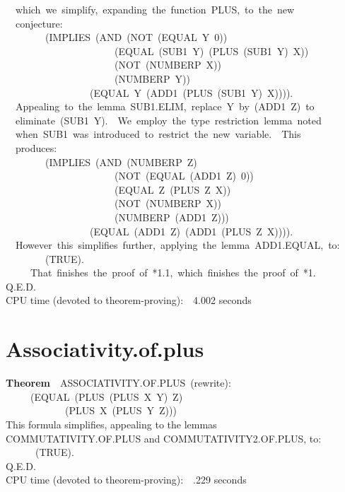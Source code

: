 \documentclass[10pt]{book}
\newenvironment{pubasis}{\begin{flushleft}}{\end{flushleft}}
\newcommand{\axiomordefinition}[1]{\vspace{6pt}\Large\textsf{\textbf{#1}}\normalsize}
\begin{document}
\begin{pubasis}
~~which~we~simplify,~expanding~the~function~PLUS,~to~the~new\\
~~conjecture:\\

~~~~~~~~(IMPLIES~(AND~(NOT~(EQUAL~Y~0))\\
~~~~~~~~~~~~~~~~~~~~~~(EQUAL~(SUB1~Y)~(PLUS~(SUB1~Y)~X))\\
~~~~~~~~~~~~~~~~~~~~~~(NOT~(NUMBERP~X))\\
~~~~~~~~~~~~~~~~~~~~~~(NUMBERP~Y))\\
~~~~~~~~~~~~~~~~~(EQUAL~Y~(ADD1~(PLUS~(SUB1~Y)~X)))).\\

~~Appealing~to~the~lemma~SUB1.ELIM,~replace~Y~by~(ADD1~Z)~to\\
~~eliminate~(SUB1~Y).~~We~employ~the~type~restriction~lemma~noted\\
~~when~SUB1~was~introduced~to~restrict~the~new~variable.~~This\\
~~produces:\\

~~~~~~~~(IMPLIES~(AND~(NUMBERP~Z)\\
~~~~~~~~~~~~~~~~~~~~~~(NOT~(EQUAL~(ADD1~Z)~0))\\
~~~~~~~~~~~~~~~~~~~~~~(EQUAL~Z~(PLUS~Z~X))\\
~~~~~~~~~~~~~~~~~~~~~~(NOT~(NUMBERP~X))\\
~~~~~~~~~~~~~~~~~~~~~~(NUMBERP~(ADD1~Z)))\\
~~~~~~~~~~~~~~~~~(EQUAL~(ADD1~Z)~(ADD1~(PLUS~Z~X)))).\\

~~However~this~simplifies~further,~applying~the~lemma~ADD1.EQUAL,~to:\\

~~~~~~~~(TRUE).\\

~~~~~That~finishes~the~proof~of~*1.1,~which~finishes~the~proof~of~*1.\\
Q.E.D.\\

CPU time (devoted to theorem-proving):~~4.002 seconds\\
\end{pubasis}
\section{Associativity.of.plus}
\begin{pubasis}
\axiomordefinition{Theorem}~~ASSOCIATIVITY.OF.PLUS~(rewrite):\\
~~~~~(EQUAL~(PLUS~(PLUS~X~Y)~Z)\\
~~~~~~~~~~~~(PLUS~X~(PLUS~Y~Z)))\\

This formula simplifies, appealing to the lemmas\\
COMMUTATIVITY.OF.PLUS and COMMUTATIVITY2.OF.PLUS, to:\\

~~~~~~(TRUE).\\

Q.E.D.\\

CPU time (devoted to theorem-proving):~~.229 seconds\\
\end{pubasis}
\end{document}

